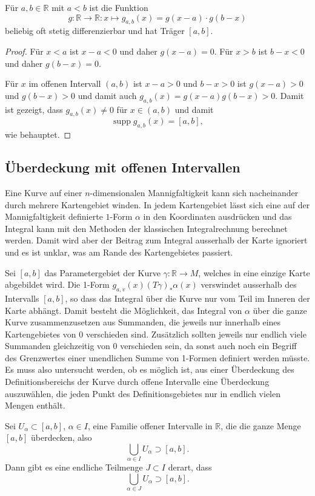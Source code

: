 \begin{satz}
Für $a,b\in\mathbb{R}$ mit $a<b$ ist
die Funktion
\[
g
\colon
\mathbb{R}\to\mathbb{R}
:
x\mapsto
g_{a,b}(x)
=
g(x-a)\cdot g(b-x)
\]
beliebig oft stetig differenzierbar und hat Träger $[a,b]$.
\end{satz}

\begin{proof}
Für $x<a$ ist $x-a<0$ und daher $g(x-a)=0$.
Für $x>b$ ist $b-x<0$ und daher $g(b-x)=0$.

Für $x$ im offenen Intervall $(a,b)$ ist $x-a>0$ und $b-x>0$ ist
$g(x-a)>0$ und $g(b-x)>0$ und damit
auch $g_{a,b}(x)=g(x-a)g(b-x)>0$.
Damit ist gezeigt, dass $g_{a,b}(x)\ne 0$ für $x\in(a,b)$ und damit
\[
\operatorname{supp} g_{a,b}(x)
=
[a,b],
\]
wie behauptet.
\end{proof}

%
%
\subsection{Überdeckung mit offenen Intervallen}
Eine Kurve auf einer $n$-dimensionalen Mannigfaltigkeit kann sich
nacheinander durch mehrere Kartengebiet winden.
In jedem Kartengebiet lässt sich eine auf der Mannigfaltigkeit
definierte $1$-Form $\alpha$ in den Koordinaten ausdrücken und das
Integral kann mit den Methoden der klassischen Integralrechnung
berechnet werden.
Damit wird aber der Beitrag zum Integral ausserhalb der Karte
ignoriert und es ist unklar, was am Rande des Kartengebietes
passiert.

Sei $[a,b]$ das Parametergebiet der Kurve $\gamma\colon\mathbb{R}\to M$,
welches in eine einzige Karte abgebildet wird.
Die 1-Form $g_{a,v}(x)(T\gamma)_*\alpha(x)$ verswindet ausserhalb
des Intervalls $[a,b]$, so dass das Integral über die Kurve nur
vom Teil im Inneren der Karte abhängt.
Damit besteht die Möglichkeit, das Integral von $\alpha$ über
die ganze Kurve zusammenzusetzen aus Summanden, die jeweils nur
innerhalb eines Kartengebietes von $0$ verschieden sind.
Zusätzlich sollten jeweils nur endlich viele Summanden gleichzeitig
von 0 verschieden sein, da sonst auch noch ein Begriff des Grenzwertes
einer unendlichen Summe von 1-Formen definiert werden müsste.
Es muss also untersucht werden, ob es möglich ist, aus einer
Überdeckung des Definitionsbereichs der Kurve durch offene Intervalle
eine Überdeckung auszuwählen, die jeden Punkt des Definitionsgebietes
nur in endlich vielen Mengen enthält.

\begin{satz}
\label{buch:kurvenintegral:zerlegung:satz:kompakt}
Sei $U_\alpha \subset [a,b]$, $\alpha\in I$, eine Familie offener
Intervalle in $\mathbb{R}$, die die ganze Menge $[a,b]$ überdecken,
also
\[
\bigcup_{\alpha\in I} U_\alpha \supset [a,b].
\]
Dann gibt es eine endliche Teilmenge $J\subset I$ derart, dass
\[
\bigcup_{\alpha\in J}U_\alpha\supset [a,b].
\]
\end{satz}

